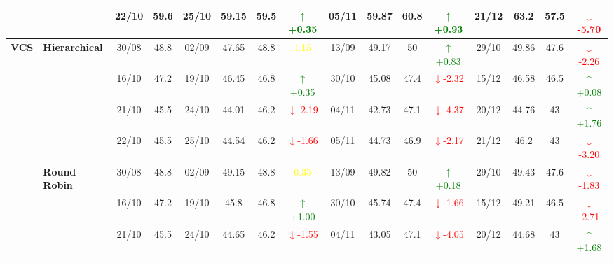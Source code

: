\documentclass{ieeeaccess}
\begin{document}
{\begin{longtable}{llcc|cccc|cccc|cccc}
&
& 22/10 & 59.6 & 25/10 & 59.15 & 59.5 & \textcolor{green}{\(\uparrow\)+0.35} & 05/11 & 59.87 & 60.8 & \textcolor{green}{\(\uparrow\)+0.93} & 21/12 & 63.2 & 57.5 & \textcolor{red}{\(\downarrow\)-5.70} \\
\midrule



\multirow{12}{*}{\textbf{VCS}} 
& \textbf{Hierarchical}
& 30/08 & 48.8 & 02/09 & 47.65 & 48.8 & \textcolor{yellow}{1.15} & 13/09 & 49.17 & 50 & \textcolor{green}{\(\uparrow\)+0.83} & 29/10 & 49.86 & 47.6 & \textcolor{red}{\(\downarrow\)-2.26} \\

&
& 16/10 & 47.2 & 19/10 & 46.45 & 46.8 & \textcolor{green}{\(\uparrow\)+0.35} & 30/10 & 45.08 & 47.4 & \textcolor{red}{\(\downarrow\)-2.32} & 15/12 & 46.58 & 46.5 & \textcolor{green}{\(\uparrow\)+0.08} \\

&
& 21/10 & 45.5 & 24/10 & 44.01 & 46.2 & \textcolor{red}{\(\downarrow\)-2.19} & 04/11 & 42.73 & 47.1 & \textcolor{red}{\(\downarrow\)-4.37} & 20/12 & 44.76 & 43 & \textcolor{green}{\(\uparrow\)+1.76} \\

&
& 22/10 & 45.5 & 25/10 & 44.54 & 46.2 & \textcolor{red}{\(\downarrow\)-1.66} & 05/11 & 44.73 & 46.9 & \textcolor{red}{\(\downarrow\)-2.17} & 21/12 & 46.2 & 43 & \textcolor{red}{\(\downarrow\)-3.20} \\
\cmidrule(lr){2-16}


& \textbf{Round Robin}
& 30/08 & 48.8 & 02/09 & 49.15 & 48.8 & \textcolor{yellow}{0.35} & 13/09 & 49.82 & 50 & \textcolor{green}{\(\uparrow\)+0.18} & 29/10 & 49.43 & 47.6 & \textcolor{red}{\(\downarrow\)-1.83} \\

&
& 16/10 & 47.2 & 19/10 & 45.8 & 46.8 & \textcolor{green}{\(\uparrow\)+1.00} & 30/10 & 45.74 & 47.4 & \textcolor{red}{\(\downarrow\)-1.66} & 15/12 & 49.21 & 46.5 & \textcolor{red}{\(\downarrow\)-2.71} \\

&
& 21/10 & 45.5 & 24/10 & 44.65 & 46.2 & \textcolor{red}{\(\downarrow\)-1.55} & 04/11 & 43.05 & 47.1 & \textcolor{red}{\(\downarrow\)-4.05} & 20/12 & 44.68 & 43 & \textcolor{green}{\(\uparrow\)+1.68} \\


\end{longtable}}
\end{document}
